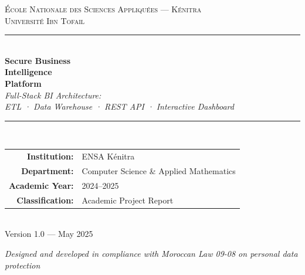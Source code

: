 \documentclass[12pt, a4paper]{report}
\begin{document}
\begin{titlepage}
  \pagecolor{ENSABlue}

  \vspace*{2cm}
  \begin{center}
    {\color{white}\fontsize{11}{13}\selectfont\textsc{
      École Nationale des Sciences Appliquées — Kénitra\\[4pt]
      Université Ibn Tofail}}\\[0.4cm]
    \color{ENSAGold}\rule{8cm}{1.5pt}\\[1.5cm]

    {\color{white}\fontsize{36}{44}\bfseries\selectfont
      Secure Business\\[6pt] Intelligence\\[6pt] Platform}\\[1cm]

    {\color{ENSAGold}\fontsize{18}{22}\selectfont\textit{
      Full-Stack BI Architecture:\\[4pt]
      ETL · Data Warehouse · REST API · Interactive Dashboard}}\\[2.5cm]

    \color{ENSAGold}\rule{10cm}{0.6pt}\\[1cm]

    \begin{tabular}{rl}
      \color{white}\textbf{Institution:} & \color{ENSAGold} ENSA Kénitra \\[6pt]
      \color{white}\textbf{Department:}  & \color{ENSAGold} Computer Science \& Applied Mathematics \\[6pt]
      \color{white}\textbf{Academic Year:} & \color{ENSAGold} 2024--2025 \\[6pt]
      \color{white}\textbf{Classification:} & \color{ENSAGold} Academic Project Report \\
    \end{tabular}\\[2cm]

    {\color{white!80!gray}\small Version 1.0 — May 2025}
  \end{center}
  \vfill
  \begin{center}
    \color{white}\small\textit{
      Designed and developed in compliance with Moroccan Law 09-08 on personal data protection}
  \end{center}
\end{titlepage}
\pagecolor{white}
\end{document}
